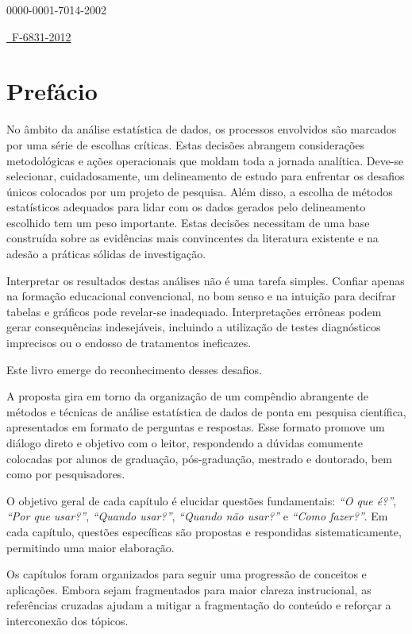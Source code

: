 \documentclass[
]{book}
\begin{document}
0000-0001-7014-2002

\href{https://publons.com/researcher/F-6831-2012}{~F-6831-2012}

\hypertarget{prefuxe1cio}{%
\chapter*{Prefácio}\label{prefuxe1cio}}

No âmbito da análise estatística de dados, os processos envolvidos são marcados por uma série de escolhas críticas. Estas decisões abrangem considerações metodológicas e ações operacionais que moldam toda a jornada analítica. Deve-se selecionar, cuidadosamente, um delineamento de estudo para enfrentar os desafios únicos colocados por um projeto de pesquisa. Além disso, a escolha de métodos estatísticos adequados para lidar com os dados gerados pelo delineamento escolhido tem um peso importante. Estas decisões necessitam de uma base construída sobre as evidências mais convincentes da literatura existente e na adesão a práticas sólidas de investigação.

Interpretar os resultados destas análises não é uma tarefa simples. Confiar apenas na formação educacional convencional, no bom senso e na intuição para decifrar tabelas e gráficos pode revelar-se inadequado. Interpretações errôneas podem gerar consequências indesejáveis, incluindo a utilização de testes diagnósticos imprecisos ou o endosso de tratamentos ineficazes.

Este livro emerge do reconhecimento desses desafios.

A proposta gira em torno da organização de um compêndio abrangente de métodos e técnicas de análise estatística de dados de ponta em pesquisa científica, apresentados em formato de perguntas e respostas. Esse formato promove um diálogo direto e objetivo com o leitor, respondendo a dúvidas comumente colocadas por alunos de graduação, pós-graduação, mestrado e doutorado, bem como por pesquisadores.

O objetivo geral de cada capítulo é elucidar questões fundamentais: \emph{``O que é?''}, \emph{``Por que usar?''}, \emph{``Quando usar?''}, \emph{``Quando não usar?''} e \emph{``Como fazer?''}. Em cada capítulo, questões específicas são propostas e respondidas sistematicamente, permitindo uma maior elaboração.

Os capítulos foram organizados para seguir uma progressão de conceitos e aplicações. Embora sejam fragmentados para maior clareza instrucional, as referências cruzadas ajudam a mitigar a fragmentação do conteúdo e reforçar a interconexão dos tópicos.
\end{document}
